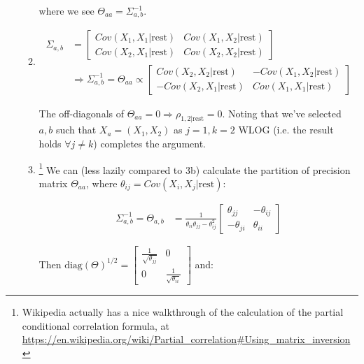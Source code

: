 \documentclass[11pt]{article}
\begin{document}
\begin{enumerate}
\begin{enumerate}[label=(\alph*)]
        where we see $\Theta_{aa} = \Sigma_{a,b}^{-1}$.

    \item 
        \begin{align*}
            \Sigma_{a,b}
            &=
            \begin{bmatrix}
                Cov(X_1, X_1 | \text{rest})
                & Cov(X_1, X_2 | \text{rest})
                \\
                Cov(X_2, X_1 | \text{rest})
                & Cov(X_2, X_2 | \text{rest})   
            \end{bmatrix}
            \\
            &\Rightarrow 
            \Sigma_{a,b}^{-1}
            =
            \Theta_{aa}
            \propto 
            \begin{bmatrix}
                Cov(X_2, X_2 | \text{rest})
                & -Cov(X_1, X_2 | \text{rest})
                \\
                -Cov(X_2, X_1 | \text{rest})
                & Cov(X_1, X_1 | \text{rest})   
            \end{bmatrix}
        \end{align*}

        The off-diagonals of $\Theta_{aa}=0 \Rightarrow \rho_{1, 2|\text{rest}}=0$. Noting that we've selected $a,b$ such that $X_a=(X_1, X_2)$ as $j=1, k=2$ WLOG (i.e. the result holds $\forall j\neq k$) completes the argument.


    \item\footnote{Wikipedia actually has a nice  walkthrough of the calculation of the partial conditional correlation formula, at  \url{https://en.wikipedia.org/wiki/Partial_correlation\#Using_matrix_inversion}}
        We can (less lazily compared to 3b) calculate the partition of precision matrix $\Theta_{aa}$, where $\theta_{ij} = Cov(X_i, X_j | \text{rest})$: 

        \begin{align*}
        \Sigma^{-1}_{a,b}
        =
        \Theta_{a,b}
        &=
        \frac{1}{\theta_{ii}\theta_{jj} - \theta_{ij}^2}
        \begin{bmatrix}
            \theta_{jj}
            & -\theta_{ij}
            \\
            -\theta_{ji}
            & \theta_{ii}
        \end{bmatrix}
        \end{align*}

        Then 
        $\text{diag}(\Theta)^{1/2}
        =
        \begin{bmatrix}
        \frac{1}{\sqrt{\theta_{jj}}} & 0 \\
        0 & \frac{1}{\sqrt{\theta_{ii}}}
        \end{bmatrix}$ and: 



\end{enumerate}
\end{enumerate}
\end{document}
